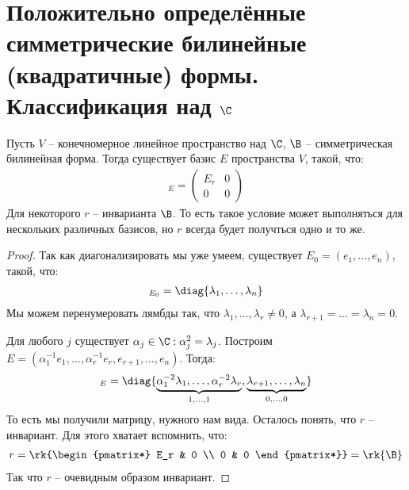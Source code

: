 \section{Положительно определённые симметрические билинейные (квадратичные) формы. Классификация над $\C$}
\begin{theorem-non}
    Пусть $V$ -- конечномерное линейное пространство над $\C$, $\B$ -- симметрическая билинейная форма. Тогда существует 
    базис $E$ пространства $V$, такой, что: 
    \begin{gather*}
        [\B]_E = \begin{pmatrix*}
            E_r & 0 \\
            0 & 0
        \end{pmatrix*} 
    \end{gather*} 
    Для некоторого $r$ -- инварианта $\B$. То есть такое условие может выполняться для нескольких различных базисов, но $r$ всегда будет получться одно и то же. 
\end{theorem-non}
\begin{proof}
    Так как диагонализировать мы уже умеем, существует $E_0 = (e_1, \dots, e_n)$, такой, что: 
    \begin{gather*}
        [\B]_{E_0} = \diag{\lambda_1, \dots, \lambda_n}
    \end{gather*}
    Мы можем перенумеровать лямбды так, что $\lambda_1, \dots, \lambda_r \neq 0$, а $\lambda_{r+1} = \dots = \lambda_n = 0$. 

    Для любого $j$ существует $\alpha_j \in \C : \alpha_j^2 = \lambda_j$. 
    Построим $E = (\alpha^{-1}_1 e_1, \dots, \alpha^{-1}_r e_r, e_{r+1}, \dots, e_n)$. 
    Тогда: 
    \begin{gather*}
        [\B]_E = \diag{\underbrace{\alpha_1^{-2} \lambda_1, \dots, \alpha_r^{-2} \lambda_r}_{1, \dots, 1}, \underbrace{\lambda_{r+1}, \dots, \lambda_n}_{0, \dots, 0}}
    \end{gather*}
    То есть мы получили матрицу, нужного нам вида. Осталось понять, что $r$ -- инвариант. Для этого хватает вспомнить, что: 
    \begin{gather*}
        r = \rk{\begin{pmatrix*}
            E_r & 0 \\
            0 & 0
        \end{pmatrix*}} = \rk{\B}
    \end{gather*}
    Так что $r$ -- очевидным образом инвариант. 
\end{proof}